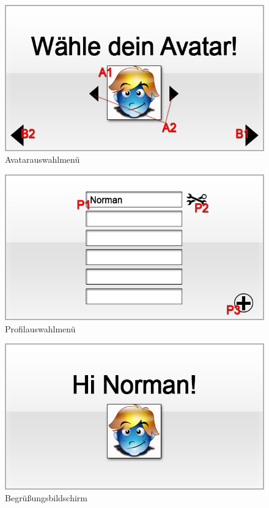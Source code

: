 \begin{figure}[H]
\centering
\includegraphics[scale=0.55]{../gui/_jpeg_numeration/registration3.jpg}
\caption{Avatarauswahlmenü}
\label{fig:Avatarauswahlmenu}
\end{figure}

\begin{figure}[H]
\centering
\includegraphics[scale=0.55]{../gui/_jpeg_numeration/choose_profile.jpg}
\caption{Profilauswahlmenü}
\label{fig:Profilauswahlmenu}
\end{figure}

\begin{figure}[H]
\centering
\includegraphics[scale=0.55]{../gui/_jpeg_numeration/welcome.jpg}
\caption{Begrüßungsbildschirm}
\label{fig:Begrussungsbildschirm}
\end{figure}

